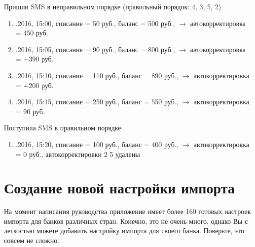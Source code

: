 \documentclass[a4paper,10pt,russian]{sphinxmanual}
\begin{document}
\sphinxAtStartPar
Пришли SMS в неправильном порядке (правильный порядок: 4, 3, 5, 2)
\begin{enumerate}
%
\setcounter{enumi}{1}
\item {} 
.2016, 15:00, списание = \sphinxhyphen{}50 руб., баланс = 500 руб., \(\rightarrow\) автокорректировка = \sphinxhyphen{}450 руб.

\item {} 
.2016, 15:05, списание = \sphinxhyphen{}90 руб., баланс = 800 руб., \(\rightarrow\) автокорректировка = +390 руб.

\item {} 
.2016, 15:10, списание = \sphinxhyphen{}110 руб., баланс = 890 руб., \(\rightarrow\) автокорректировка = +200 руб.

\item {} 
.2016, 15:15, списание = \sphinxhyphen{}250 руб., баланс = 550 руб., \(\rightarrow\) автокорректировка = \sphinxhyphen{}90 руб.

\end{enumerate}

\sphinxAtStartPar
Поступила SMS в правильном порядке
\begin{enumerate}
%
\setcounter{enumi}{5}
\item {} 
.2016, 15:20, списание = \sphinxhyphen{}100 руб., баланс = 400 руб., \(\rightarrow\) автокорректировка = 0 руб., автокорректировки 2 \sphinxhyphen{} 5 удалены

\end{enumerate}


\section{Создание новой настройки импорта}
\label{\detokenize{notifications:id2}}
\sphinxAtStartPar
На момент написания руководства приложение имеет более 160 готовых настроек импорта для банков различных стран.
Конечно, это не очень много, однако Вы с легкостью можете добавить настройку импорта для своего банка.
Поверьте, это совсем не сложно.

\noindent{}

\noindent{}
\end{document}
